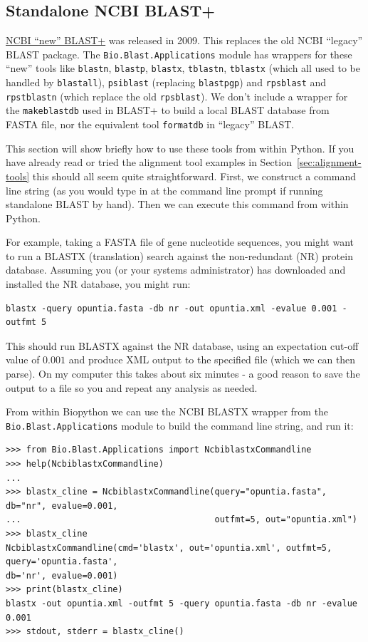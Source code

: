 \documentclass{report}
\begin{document}
\subsection{Standalone NCBI BLAST+}

\href{http://blast.ncbi.nlm.nih.gov/Blast.cgi?CMD=Web&PAGE_TYPE=BlastDocs&DOC_TYPE=Download}
{NCBI ``new'' BLAST+} was released in 2009. This replaces the old NCBI ``legacy'' BLAST
package. The \verb|Bio.Blast.Applications| module has wrappers for these ``new'' tools
like \verb|blastn|, \verb|blastp|, \verb|blastx|, \verb|tblastn|, \verb|tblastx|
(which all used to be handled by \verb|blastall|), \verb|psiblast|
(replacing \verb|blastpgp|) and \verb|rpsblast| and \verb|rpstblastn|
(which replace the old \verb|rpsblast|).
We don't include a wrapper for the \verb|makeblastdb| used in BLAST+ to build a
local BLAST database from FASTA file, nor the equivalent tool \verb|formatdb| in
``legacy'' BLAST.

This section will show briefly how to use these tools from within Python. If you have
already read or tried the alignment tool examples in Section~\ref{sec:alignment-tools}
this should all seem quite straightforward. First, we construct a command line string
(as you would type in at the command line prompt if running standalone BLAST by hand).
Then we can execute this command from within Python.

For example, taking a FASTA file of gene nucleotide sequences, you might want to
run a BLASTX (translation) search against the non-redundant (NR) protein database.
Assuming you (or your systems administrator) has downloaded and installed the NR
database, you might run:

\begin{verbatim}
blastx -query opuntia.fasta -db nr -out opuntia.xml -evalue 0.001 -outfmt 5
\end{verbatim}

This should run BLASTX against the NR database, using an expectation cut-off value
of $0.001$ and produce XML output to the specified file (which we can then parse).
On my computer this takes about six minutes - a good reason to save the output
to a file so you and repeat any analysis as needed.

From within Biopython we can use the NCBI BLASTX wrapper from the
\verb|Bio.Blast.Applications| module to build the command line string,
and run it:

\begin{verbatim}
>>> from Bio.Blast.Applications import NcbiblastxCommandline
>>> help(NcbiblastxCommandline)
...
>>> blastx_cline = NcbiblastxCommandline(query="opuntia.fasta", db="nr", evalue=0.001,
...                                      outfmt=5, out="opuntia.xml")
>>> blastx_cline
NcbiblastxCommandline(cmd='blastx', out='opuntia.xml', outfmt=5, query='opuntia.fasta',
db='nr', evalue=0.001)
>>> print(blastx_cline)
blastx -out opuntia.xml -outfmt 5 -query opuntia.fasta -db nr -evalue 0.001
>>> stdout, stderr = blastx_cline()
\end{verbatim}
\end{document}
